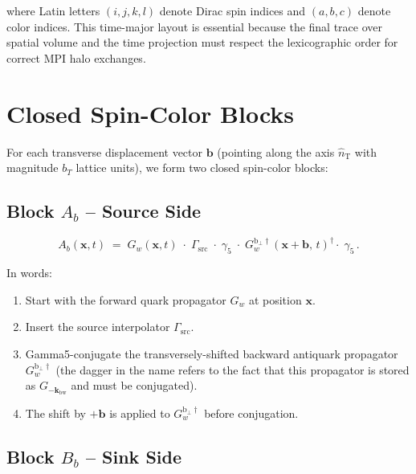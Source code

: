 \documentclass[11pt,a4paper]{article}
\newcommand{\Gfive}{\gamma_{5}}
\begin{document}
where Latin letters $(i,j,k,l)$ denote Dirac spin indices and $(a,b,c)$ denote
color indices.  This time-major layout is essential because the final trace over
spatial volume and the time projection must respect the lexicographic order for
correct MPI halo exchanges.

\section{Closed Spin-Color Blocks}

For each transverse displacement vector $\mathbf{b}$ (pointing along the axis
$\hat{n}_{\mathrm{T}}$ with magnitude $b_{T}$ lattice units), we form two
closed spin-color blocks:

\subsection{Block $A_{b}$ -- Source Side}

\begin{equation}\label{eq:A_block}
A_{b}(\mathbf{x}, t) \;=\;
G_{w}(\mathbf{x}, t)\;
\cdot\;
\Gamma_{\mathrm{src}}\;
\cdot\;
\Gfive\;
\cdot\;
G_{w}^{\mathrm{b}_{\perp}\dagger}
   (\mathbf{x}+\mathbf{b},\,t)^{\dagger}
\cdot\;
\Gfive\, .
\end{equation}

\noindent
In words:
\begin{enumerate}[nosep]
  \item Start with the forward quark propagator $G_{w}$ at position $\mathbf{x}$.
  \item Insert the source interpolator $\Gamma_{\mathrm{src}}$.
  \item Gamma5-conjugate the transversely-shifted backward antiquark propagator
        $G_{w}^{\mathrm{b}_{\perp}\dagger}$ (the dagger in the name refers to the
        fact that this propagator is stored as $G_{-\mathbf{k}_{\mathrm{bw}}}$
        and must be conjugated).
  \item The shift by $+\mathbf{b}$ is applied to $G_{w}^{\mathrm{b}_{\perp}\dagger}$
        before conjugation.
\end{enumerate}

\subsection{Block $B_{b}$ -- Sink Side}
\end{document}
